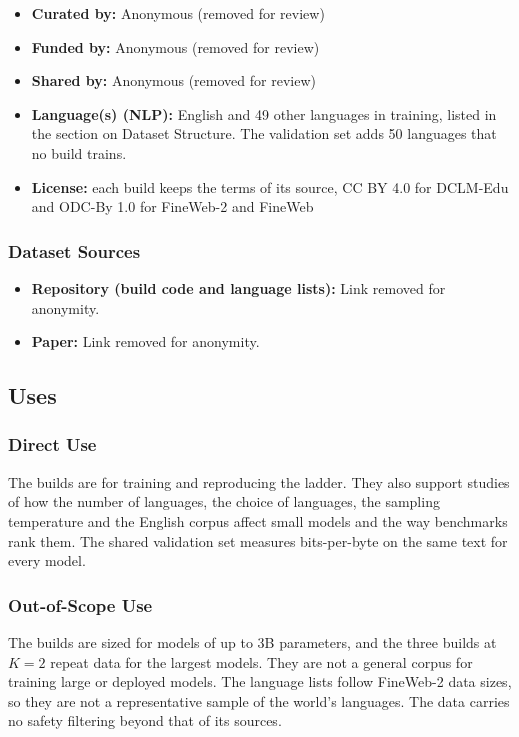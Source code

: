 \begin{itemize}[itemsep=1pt,topsep=2pt]
    \item \textbf{Curated by:} Anonymous (removed for review)
    \item \textbf{Funded by:} Anonymous (removed for review)
    \item \textbf{Shared by:} Anonymous (removed for review)
    \item \textbf{Language(s) (NLP):} English and 49 other languages in training, listed in the section on Dataset Structure. The validation set adds 50 languages that no build trains.
    \item \textbf{License:} each build keeps the terms of its source, CC BY 4.0 for DCLM-Edu and ODC-By 1.0 for FineWeb-2 and FineWeb
\end{itemize}

\subsubsection*{Dataset Sources}

\begin{itemize}[itemsep=1pt,topsep=2pt]
    \item \textbf{Repository (build code and language lists):} Link removed for anonymity.
    \item \textbf{Paper:} Link removed for anonymity.
\end{itemize}

\subsection*{Uses}

\subsubsection*{Direct Use}

The builds are for training and reproducing the ladder. They also support studies of how the number of languages, the choice of languages, the sampling temperature and the English corpus affect small models and the way benchmarks rank them. The shared validation set measures bits-per-byte on the same text for every model.

\subsubsection*{Out-of-Scope Use}

The builds are sized for models of up to 3B parameters, and the three builds at $K=2$ repeat data for the largest models. They are not a general corpus for training large or deployed models. The language lists follow FineWeb-2 data sizes, so they are not a representative sample of the world's languages. The data carries no safety filtering beyond that of its sources.

